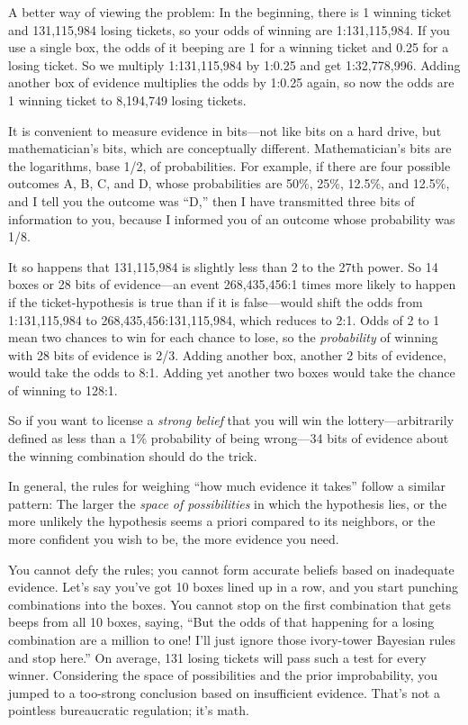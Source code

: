 {
 A better way of viewing the problem: In the beginning, there is 1
winning ticket and 131,115,984 losing tickets, so your odds of winning
are 1:131,115,984. If you use a single box, the odds of it beeping are
1 for a winning ticket and 0.25 for a losing ticket. So we multiply
1:131,115,984 by 1:0.25 and get 1:32,778,996. Adding another box of
evidence multiplies the odds by 1:0.25 again, so now the odds are 1
winning ticket to 8,194,749 losing tickets.}

{
 It is convenient to measure evidence in bits---not like bits on a
hard drive, but mathematician's bits, which are
conceptually different. Mathematician's bits are the
logarithms, base 1/2, of probabilities. For example, if there are four
possible outcomes A, B, C, and D, whose probabilities are 50\%, 25\%,
12.5\%, and 12.5\%, and I tell you the outcome was
``D,'' then I have transmitted three
bits of information to you, because I informed you of an outcome whose
probability was 1/8.}

{
 It so happens that 131,115,984 is slightly less than 2 to the 27th
power. So 14 boxes or 28 bits of evidence---an event 268,435,456:1
times more likely to happen if the ticket-hypothesis is true than if it
is false---would shift the odds from 1:131,115,984 to
268,435,456:131,115,984, which reduces to 2:1. Odds of 2 to 1 mean two
chances to win for each chance to lose, so the \textit{probability} of
winning with 28 bits of evidence is 2/3. Adding another box, another 2
bits of evidence, would take the odds to 8:1. Adding yet another two
boxes would take the chance of winning to 128:1.}

{
 So if you want to license a \textit{strong belief} that you will
win the lottery---arbitrarily defined as less than a 1\% probability of
being wrong---34 bits of evidence about the winning combination should
do the trick.}

{
 In general, the rules for weighing ``how much
evidence it takes'' follow a similar pattern: The
larger the \textit{space of possibilities} in which the hypothesis
lies, or the more unlikely the hypothesis seems a priori compared to
its neighbors, or the more confident you wish to be, the more evidence
you need.}

{
 You cannot defy the rules; you cannot form accurate beliefs based
on inadequate evidence. Let's say
you've got 10 boxes lined up in a row, and you start
punching combinations into the boxes. You cannot stop on the first
combination that gets beeps from all 10 boxes, saying,
``But the odds of that happening for a losing
combination are a million to one! I'll just ignore
those ivory-tower Bayesian rules and stop here.'' On
average, 131 losing tickets will pass such a test for every winner.
Considering the space of possibilities and the prior improbability, you
jumped to a too-strong conclusion based on insufficient evidence.
That's not a pointless bureaucratic regulation;
it's math.}

